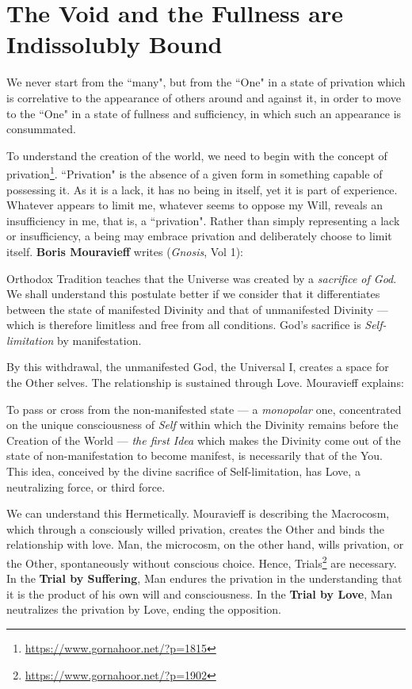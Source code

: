 \section{The Void and the Fullness are Indissolubly Bound}

\begin{quotex}
We never start from the ``many", but from the ``One" in a state of privation which is correlative to the appearance of others around and against it, in order to move to the ``One" in a state of fullness and sufficiency, in which such an appearance is consummated. 

\end{quotex}
To understand the creation of the world, we need to begin with the concept of privation\footnote{\url{https://www.gornahoor.net/?p=1815}}. ``Privation" is the absence of a given form in something capable of possessing it. As it is a lack, it has no being in itself, yet it is part of experience. Whatever appears to limit me, whatever seems to oppose my Will, reveals an insufficiency in me, that is, a ``privation". Rather than simply representing a lack or insufficiency, a being may embrace privation and deliberately choose to limit itself. \textbf{Boris Mouravieff} writes (\emph{Gnosis}, Vol 1):

\begin{quotex}
Orthodox Tradition teaches that the Universe was created by a \emph{sacrifice of God}. We shall understand this postulate better if we consider that it differentiates between the state of manifested Divinity and that of unmanifested Divinity — which is therefore limitless and free from all conditions. God's sacrifice is \emph{Self-limitation} by manifestation.

\end{quotex}


By this withdrawal, the unmanifested God, the Universal I, creates a space for the Other selves. The relationship is sustained through Love. Mouravieff explains:

\begin{quotex}
To pass or cross from the non-manifested state — a \emph{monopolar} one, concentrated on the unique consciousness of \emph{Self} within which the Divinity remains before the Creation of the World — \emph{the first Idea} which makes the Divinity come out of the state of non-manifestation to become manifest, is necessarily that of the You. This idea, conceived by the divine sacrifice of Self-limitation, has Love, a neutralizing force, or third force. 

\end{quotex}
We can understand this Hermetically. Mouravieff is describing the Macrocosm, which through a consciously willed privation, creates the Other and binds the relationship with love. Man, the microcosm, on the other hand, wills privation, or the Other, spontaneously without conscious choice. Hence, Trials\footnote{\url{https://www.gornahoor.net/?p=1902}} are necessary. In the \textbf{Trial by Suffering}, Man endures the privation in the understanding that it is the product of his own will and consciousness. In the \textbf{Trial by Love}, Man neutralizes the privation by Love, ending the opposition.

